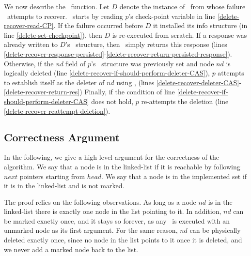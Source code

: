 We now describe the \deleterecover\ function. Let $D$ denote the instance of \delete\ 
from whose failure  \deleterecover\ attempts to recover. 
\deleterecover\ starts by reading $p$'s check-point variable 
in line \ref{delete-recover-read-CP}. If the failure occurred 
before $D$  it installed its info structure (in line \ref{delete-set-checkpoint}), 
then $D$ is re-executed from scratch. 
If a response was already written 
to $D$'s \Info\ structure, then \delete\ simply returns this response 
(lines \ref{delete-recover-response-persisted}-\ref{delete-recover-return-persisted-response}).
Otherwise, if the \emph{nd} field of $p$'s \Info\ structure was previously set 
and node $nd$ is logically deleted (line \ref{delete-recover-if-should-perform-deleter-CAS}), 
$p$ attempts to establish itself as the deleter of $nd$ using \CAS,
(lines \ref{delete-recover-deleter-CAS}-\ref{delete-recover-return-res})
\y{as the response of its \delete\ operation.} 
Finally, if the condition of line \ref{delete-recover-if-should-perform-deleter-CAS} 
does not hold, $p$ re-attempts the deletion (line \ref{delete-recover-reattempt-deletion}).



\subsection{Correctness Argument}

In the following, we give a high-level argument for the correctness of the algorithm.
We say that a node is in the linked-list if it is reachable
by following $next$ pointers starting from $head$.
We say that a node is in the implemented set if it is in the linked-list and is not marked.

The proof relies on the following observations.
As long as a node $nd$ is in the linked-list there is exactly one node in the list pointing to it.
In addition, $nd$ can be marked exactly once, and it stays so forever, as any \CAS\ is executed with an unmarked node as its first argument.
For the same reason, $nd$ can be physically deleted exactly once, since no node in the list points to it once it is deleted, and we never add a marked node back to the list.

